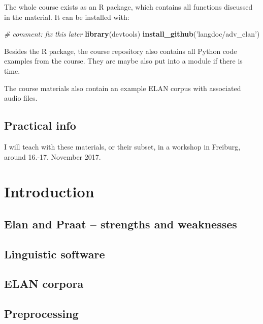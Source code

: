 \documentclass[]{book}
\newenvironment{Shaded}{\begin{snugshade}}{\end{snugshade}}
\newcommand{\KeywordTok}[1]{\textcolor[rgb]{0.13,0.29,0.53}{\textbf{#1}}}
\newcommand{\StringTok}[1]{\textcolor[rgb]{0.31,0.60,0.02}{#1}}
\newcommand{\CommentTok}[1]{\textcolor[rgb]{0.56,0.35,0.01}{\textit{#1}}}
\newcommand{\NormalTok}[1]{#1}
\theoremstyle{definition}
\theoremstyle{definition}
\theoremstyle{definition}
\theoremstyle{remark}
\begin{document}
The whole course exists as an R package, which contains all functions
discussed in the material. It can be installed with:

\begin{Shaded}
\begin{Highlighting}[]
\CommentTok{# comment: fix this later}
\KeywordTok{library}\NormalTok{(devtools)}
\KeywordTok{install_github}\NormalTok{(}\StringTok{'langdoc/adv_elan'}\NormalTok{)}
\end{Highlighting}
\end{Shaded}

Besides the R package, the course repository also contains all Python
code examples from the course. They are maybe also put into a module if
there is time.

The course materials also contain an example ELAN corpus with associated
audio files.

\section{Practical info}\label{practical-info}

I will teach with these materials, or their subset, in a workshop in
Freiburg, around 16.-17. November 2017.

\chapter{Introduction}\label{intro}

\section{Elan and Praat -- strengths and
weaknesses}\label{elan-and-praat-strengths-and-weaknesses}

\section{Linguistic software}\label{linguistic-software}

\section{ELAN corpora}\label{elan-corpora}

\section{Preprocessing}\label{preprocessing}
\end{document}
